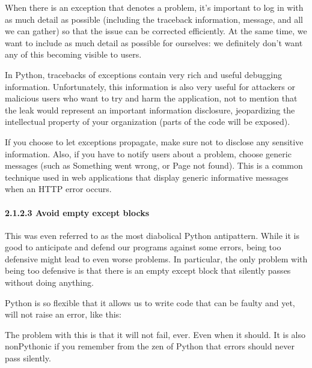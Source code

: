 \documentclass[a4paper,10pt,english]{sphinxmanual}
\begin{document}
When there is an exception that denotes a problem, it’s important to log in with as much detail as possible
(including the traceback information, message, and all we can gather) so that the issue can be corrected
efficiently. At the same time, we want to include as much detail as possible for ourselves: we definitely
don’t want any of this becoming visible to users.

In Python, tracebacks of exceptions contain very rich and useful debugging information. Unfortunately, this
information is also very useful for attackers or malicious users who want to try and harm the application, not
to mention that the leak would represent an important information disclosure, jeopardizing the intellectual
property of your organization (parts of the code will be exposed).

If you choose to let exceptions propagate, make sure not to disclose any sensitive information. Also, if you
have to notify users about a problem, choose generic messages (such as Something went wrong, or Page not
found). This is a common technique used in web applications that display generic informative messages when an
HTTP error occurs.


\paragraph{2.1.2.3 Avoid empty except blocks}
\label{\detokenize{chapters/3_general_traits/index:avoid-empty-except-blocks}}
This was even referred to as the most diabolical Python anti\sphinxhyphen{}pattern. While it is good to anticipate and
defend our programs against some errors, being too defensive might lead to even worse problems. In particular,
the only problem with being too defensive is that there is an empty except block that silently passes without
doing anything.

Python is so flexible that it allows us to write code that can be faulty and yet, will not raise an error,
like this:

\begin{sphinxVerbatim}[commandchars=\\\{\}]
\end{sphinxVerbatim}

The problem with this is that it will not fail, ever. Even when it should. It is also non\sphinxhyphen{}Pythonic if you
remember from the zen of Python that errors should never pass silently.
\end{document}
